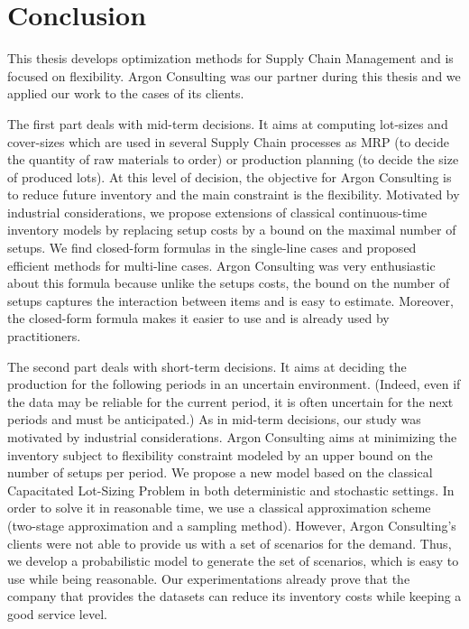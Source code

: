 \chapter*{Conclusion}
\label{chap:conclusion}


This thesis develops optimization methods for Supply Chain Management and is focused on flexibility.
Argon Consulting was our partner during this thesis and we applied our work to the cases of its clients.


The first part deals with mid-term decisions.
It aims at computing lot-sizes and cover-sizes which are used in several Supply Chain processes as MRP (to decide the quantity of raw materials to order) or production planning (to decide the size of produced lots).
At this level of decision, the objective for Argon Consulting is to reduce future inventory and the main constraint is the flexibility.
Motivated by industrial considerations, we propose extensions of classical continuous-time inventory models by replacing setup costs by a bound on the maximal number of setups.
We find closed-form formulas in the single-line cases and proposed efficient methods for multi-line cases.
Argon Consulting was very enthusiastic about this formula because unlike the setups costs, the bound on the number of setups captures the interaction between items and is easy to estimate.
Moreover, the closed-form formula makes it easier to use and is already used by practitioners.


The second part deals with short-term decisions.
It aims at deciding the production for the following periods in an uncertain environment.
(Indeed, even if the data may be reliable for the current period, it is often uncertain for the next periods and must be anticipated.)
As in mid-term decisions, our study was motivated by industrial considerations.
Argon Consulting aims at minimizing the inventory subject to flexibility constraint modeled by an upper bound on the number of setups per period.
We propose a new model based on the classical Capacitated Lot-Sizing Problem in both deterministic and stochastic settings.
In order to solve it in reasonable time, we use a classical approximation scheme (two-stage approximation and a sampling method).
However, Argon Consulting's clients were not able to provide us with a set of scenarios for the demand.
Thus, we develop a probabilistic model to generate the set of scenarios, which is easy to use while being reasonable.
Our experimentations already prove that the company that provides the datasets can reduce its inventory costs while keeping a good service level.



